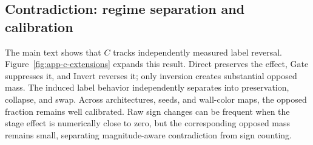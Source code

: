 \subsection{Contradiction: regime separation and calibration}
\label{app:c-extensions}



The main text shows that $C$ tracks independently measured label reversal. Figure~\ref{fig:app-c-extensions} expands this result. Direct preserves the effect, Gate suppresses it, and Invert reverses it; only inversion creates substantial opposed mass. The induced label behavior independently separates into preservation, collapse, and swap. Across architectures, seeds, and wall-color maps, the opposed fraction remains well calibrated. Raw sign changes can be frequent when the stage effect is numerically close to zero, but the corresponding opposed mass remains small, separating magnitude-aware contradiction from sign counting.


